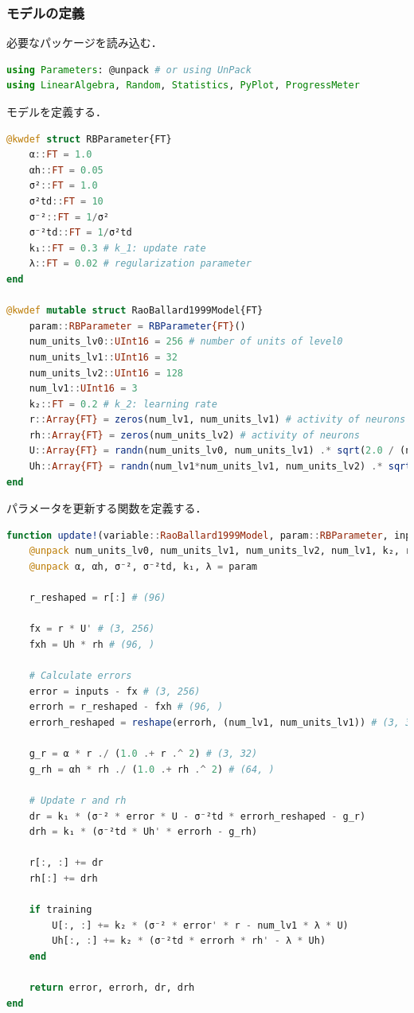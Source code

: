\subsubsection{モデルの定義}
必要なパッケージを読み込む．
\begin{lstlisting}[language=julia]
using Parameters: @unpack # or using UnPack
using LinearAlgebra, Random, Statistics, PyPlot, ProgressMeter
\end{lstlisting}
モデルを定義する．
\begin{lstlisting}[language=julia]
@kwdef struct RBParameter{FT}
    α::FT = 1.0
    αh::FT = 0.05
    σ²::FT = 1.0
    σ²td::FT = 10
    σ⁻²::FT = 1/σ²       
    σ⁻²td::FT = 1/σ²td
    k₁::FT = 0.3 # k_1: update rate
    λ::FT = 0.02 # regularization parameter
end

@kwdef mutable struct RaoBallard1999Model{FT}
    param::RBParameter = RBParameter{FT}()
    num_units_lv0::UInt16 = 256 # number of units of level0
    num_units_lv1::UInt16 = 32
    num_units_lv2::UInt16 = 128
    num_lv1::UInt16 = 3
    k₂::FT = 0.2 # k_2: learning rate
    r::Array{FT} = zeros(num_lv1, num_units_lv1) # activity of neurons
    rh::Array{FT} = zeros(num_units_lv2) # activity of neurons
    U::Array{FT} = randn(num_units_lv0, num_units_lv1) .* sqrt(2.0 / (num_units_lv0+num_units_lv1))
    Uh::Array{FT} = randn(num_lv1*num_units_lv1, num_units_lv2) .* sqrt(2.0 / (num_lv1*num_units_lv1+num_units_lv2))
end
\end{lstlisting}
パラメータを更新する関数を定義する．
\begin{lstlisting}[language=julia]
function update!(variable::RaoBallard1999Model, param::RBParameter, inputs::Array, training::Bool)
    @unpack num_units_lv0, num_units_lv1, num_units_lv2, num_lv1, k₂, r, rh, U, Uh = variable
    @unpack α, αh, σ⁻², σ⁻²td, k₁, λ = param

    r_reshaped = r[:] # (96)

    fx = r * U' # (3, 256)
    fxh = Uh * rh # (96, )

    # Calculate errors
    error = inputs - fx # (3, 256)
    errorh = r_reshaped - fxh # (96, ) 
    errorh_reshaped = reshape(errorh, (num_lv1, num_units_lv1)) # (3, 32)

    g_r = α * r ./ (1.0 .+ r .^ 2) # (3, 32)
    g_rh = αh * rh ./ (1.0 .+ rh .^ 2) # (64, )

    # Update r and rh
    dr = k₁ * (σ⁻² * error * U - σ⁻²td * errorh_reshaped - g_r)
    drh = k₁ * (σ⁻²td * Uh' * errorh - g_rh)
    
    r[:, :] += dr
    rh[:] += drh
    
    if training 
        U[:, :] += k₂ * (σ⁻² * error' * r - num_lv1 * λ * U)
        Uh[:, :] += k₂ * (σ⁻²td * errorh * rh' - λ * Uh)
    end

    return error, errorh, dr, drh
end
\end{lstlisting}
